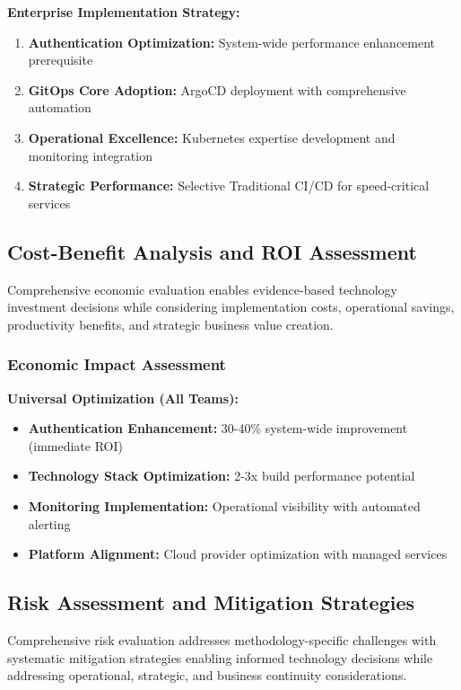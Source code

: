 \textbf{Enterprise Implementation Strategy:}
\begin{enumerate}
\item \textbf{Authentication Optimization:} System-wide performance enhancement prerequisite
\item \textbf{GitOps Core Adoption:} ArgoCD deployment with comprehensive automation
\item \textbf{Operational Excellence:} Kubernetes expertise development and monitoring integration
\item \textbf{Strategic Performance:} Selective Traditional CI/CD for speed-critical services
\end{enumerate}

\subsection{Cost-Benefit Analysis and ROI Assessment}
\label{subsec:cost_benefit_analysis}

Comprehensive economic evaluation enables evidence-based technology investment decisions while considering implementation costs, operational savings, productivity benefits, and strategic business value creation.

\subsubsection{Economic Impact Assessment}



\textbf{Universal Optimization (All Teams):}
\begin{itemize}
\item \textbf{Authentication Enhancement:} 30-40\% system-wide improvement (immediate ROI)
\item \textbf{Technology Stack Optimization:} 2-3x build performance potential
\item \textbf{Monitoring Implementation:} Operational visibility with automated alerting
\item \textbf{Platform Alignment:} Cloud provider optimization with managed services
\end{itemize}

\subsection{Risk Assessment and Mitigation Strategies}
\label{subsec:risk_assessment}

Comprehensive risk evaluation addresses methodology-specific challenges with systematic mitigation strategies enabling informed technology decisions while addressing operational, strategic, and business continuity considerations.

